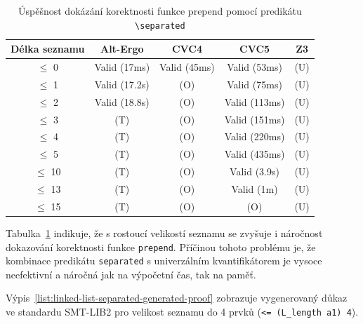 \begin{table}[H]
    \centering
    \begin{tabular}{|c|c|c|c|c|}
        \hline
        Délka seznamu & Alt-Ergo      & CVC4         & CVC5          & Z3  \\
        \hline
        $\leq$ 0      & Valid (17ms)  & Valid (45ms) & Valid (53ms)  & (U) \\
        $\leq$ 1      & Valid (17.2s) & (O)          & Valid (75ms)  & (U) \\
        $\leq$ 2      & Valid (18.8s) & (O)          & Valid (113ms) & (U) \\
        $\leq$ 3      & (T)           & (O)          & Valid (151ms) & (U) \\
        $\leq$ 4      & (T)           & (O)          & Valid (220ms) & (U) \\
        $\leq$ 5      & (T)           & (O)          & Valid (435ms) & (U) \\
        $\leq$ 10     & (T)           & (O)          & Valid (3.9s)  & (U) \\
        $\leq$ 13     & (T)           & (O)          & Valid (1m)    & (U) \\
        $\leq$ 15     & (T)           & (O)          & (O)           & (U) \\
        \hline
    \end{tabular}
    \caption{Úspěšnost dokázání korektnosti funkce prepend pomocí predikátu \texttt{\textbackslash separated}}
    \label{tab:prepend-smt-success}
\end{table}

Tabulka~\ref{tab:prepend-smt-success} indikuje,
že s rostoucí velikostí seznamu se zvyšuje i náročnost dokazování korektnosti funkce \texttt{prepend}.
Příčinou tohoto problému je, že kombinace predikátu \texttt{separated} s univerzálním kvantifikátorem
je vysoce neefektivní a náročná jak na výpočetní čas, tak na paměť.

Výpis~\ref{list:linked-list-separated-generated-proof}
zobrazuje vygenerovaný důkaz ve standardu SMT\mbox{-}LIB2
pro velikost seznamu do 4 prvků (\texttt{<= (L\_length a1) 4}).

